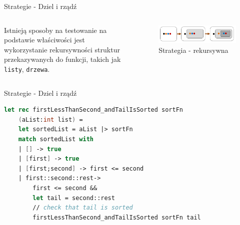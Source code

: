 \begin{frame}[fragile]{Strategie - Dziel i rządź}
    \begin{columns}[t]
            Istnieją sposoby na testowanie na podstawie właściwości jest wykorzystanie rekursywności struktur przekazywanych do funkcji, takich jak \texttt{listy}, \texttt{drzewa}. 
            \centering
            \begin{figure}
                \centering
                \includegraphics[width=1\textwidth]{images/property_induction.png}
                \caption{Strategia - rekursywna}
                \label{fig:recursive_strategy}
            \end{figure}    
    \end{columns}
\end{frame}

\begin{frame}[fragile]{Strategie - Dziel i rządź}
    \begin{lstlisting}[language=FSharp, xleftmargin=-10pt,xrightmargin=-10pt,numbers=none, basicstyle=\ttfamily\small]
    let rec firstLessThanSecond_andTailIsSorted sortFn 
    (aList:int list) =
    let sortedList = aList |> sortFn
    match sortedList with
    | [] -> true
    | [first] -> true
    | [first;second] -> first <= second
    | first::second::rest->
        first <= second &&
        let tail = second::rest
        // check that tail is sorted
        firstLessThanSecond_andTailIsSorted sortFn tail
    \end{lstlisting}
\end{frame}

